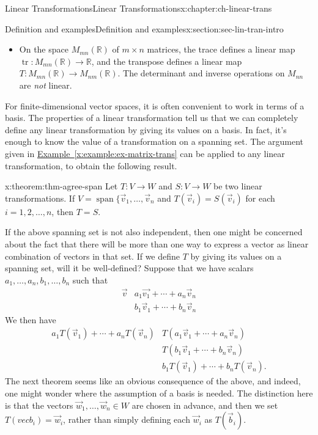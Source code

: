 \documentclass[oneside,10pt,]{book}
\numberwithin{equation}{section}
\newcommand{\spn}{\operatorname{span}}
\newcommand{\R}{\mathbb{R}}
\newcommand{\amp}{&}
\begin{document}
\begin{chapterptx}{Linear Transformations}{}{Linear Transformations}{}{}{x:chapter:ch-linear-trans}
\begin{sectionptx}{Definition and examples}{}{Definition and examples}{}{}{x:section:sec-lin-tran-intro}
\begin{itemize}[label=\textbullet]
\begin{align*}
\end{align*}
are both linear.%
\item{}On the space \(M_{mn}(\R)\) of \(m\times n\) matrices, the trace defines a linear map \(\operatorname{tr}:M_{mn}(\R)\to \R\), and the transpose defines a linear map \(T:M_{mn}(\R)\to M_{nm}(\R)\). The determinant and inverse operations on \(M_{nn}\) are \emph{not} linear.%
\end{itemize}
%
\par
For finite-dimensional vector spaces, it is often convenient to work in terms of a basis. The properties of a linear transformation tell us that we can completely define any linear transformation by giving its values on a basis. In fact, it's enough to know the value of a transformation on a spanning set. The argument given in \hyperref[x:example:ex-matrix-trans]{Example~\ref{x:example:ex-matrix-trans}} can be applied to any linear transformation, to obtain the following result.%
\begin{theorem}{}{}{x:theorem:thm-agree-span}%
Let \(T:V\to W\) and \(S:V\to W\) be two linear transformations. If \(V = \spn\{\vec{v}_1,\ldots, \vec{v}_n\) and \(T(\vec{v}_i)=S(\vec{v}_i)\) for each \(i=1,2,\ldots, n\), then \(T=S\).%
\end{theorem}
If the above spanning set is not also independent, then one might be concerned about the fact that there will be more than one way to express a vector as linear combination of vectors in that set. If we define \(T\) by giving its values on a spanning set, will it be well-defined? Suppose that we have scalars \(a_1,\ldots, a_n, b_1,\ldots, b_n\) such that%
\begin{align*}
\vec{v} \amp a_1\vec{v_1}+\cdots + a_n\vec{v}_n\\
\amp b_1\vec{v}_1+\cdots + b_n\vec{v}_n
\end{align*}
We then have%
\begin{align*}
a_1T(\vec{v}_1)+\cdots + a_nT(\vec{v}_n) \amp T(a_1\vec{v}_1+\cdots + a_n\vec{v}_n) \\
\amp T(b_1\vec{v}_1+\cdots +b_n\vec{v}_n)\\
\amp b_1T(\vec{v}_1)+\cdots +b_nT(\vec{v}_n)\text{.}
\end{align*}
The next theorem seems like an obvious consequence of the above, and indeed, one might wonder where the assumption of a basis is needed. The distinction here is that the vectors \(\vec{w}_1,\ldots, \vec{w}_n\in W\) are chosen in advance, and then we set \(T(vec{b}_i)=\vec{w}_i\), rather than simply defining each \(\vec{w}_i\) as \(T(\vec{b}_i)\).%

\end{sectionptx}
\end{chapterptx}
\end{document}
